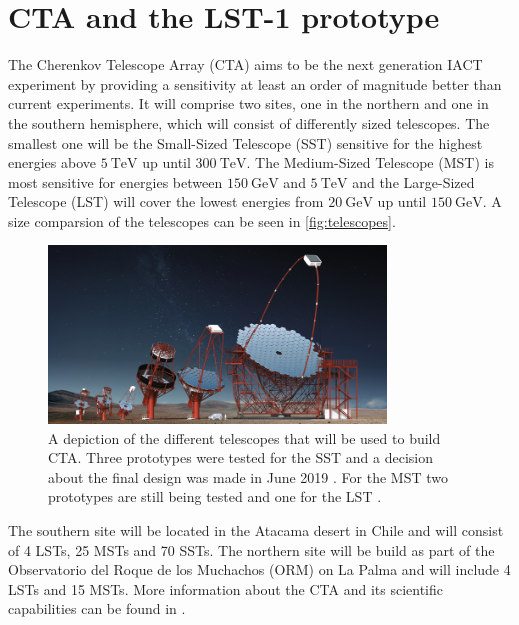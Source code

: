\section{CTA and the LST-1 prototype}
The Cherenkov Telescope Array (CTA) aims to be the next generation IACT experiment by providing a sensitivity at least an order of magnitude better than current experiments.
It will comprise two sites, one in the northern and one in the southern hemisphere, which will consist of differently sized telescopes. 
The smallest one will be the Small-Sized Telescope (SST) sensitive for the highest energies above $\SI{5}{\tera\electronvolt}$ up until $\SI{300}{\tera\electronvolt}$.
The Medium-Sized Telescope (MST) is most sensitive for energies between $\SI{150}{\giga\electronvolt}$ and $\SI{5}{\tera\electronvolt}$ and the 
Large-Sized Telescope (LST) will cover the lowest energies from $\SI{20}{\giga\electronvolt}$ up until $\SI{150}{\giga\electronvolt}$.
A size comparsion of the telescopes can be seen in \autoref{fig:telescopes}.
\begin{figure}
    \centering
    \includegraphics[width=0.8\textwidth]{images/CTA_telescopes.png}
    \caption{A depiction of the different telescopes that will be used to build CTA. 
        Three prototypes were tested for the SST and a decision about the final design was made in June 2019 \cite{sst_decision}.
        For the MST two prototypes are still being tested and one for the LST \cite{cta-website}.
    }
    \label{fig:telescopes}
\end{figure}

The southern site will be located in the Atacama desert in Chile and will consist of \num{4} LSTs, \num{25} MSTs and \num{70} SSTs.
The northern site will be build as part of the Observatorio del Roque de los Muchachos (ORM) on La Palma and will include \num{4} LSTs and \num{15} MSTs.
More information about the CTA and its scientific capabilities can be found in \cite{science_with_cta}.

